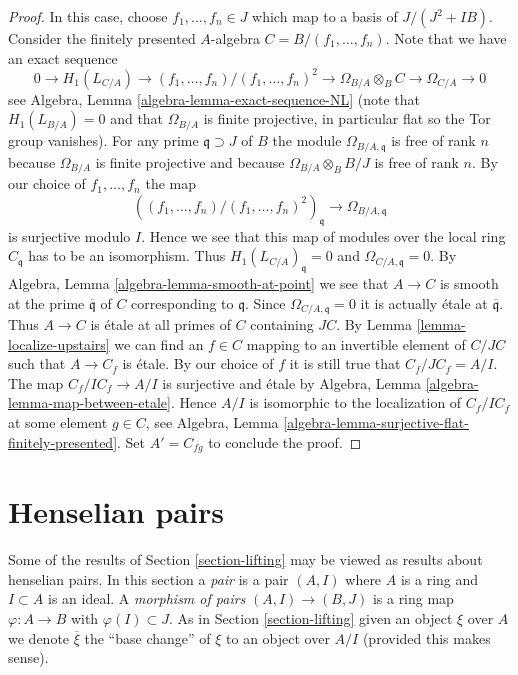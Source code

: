 \begin{proof}
\medskip\noindent
In this case, choose $f_1, \ldots, f_n \in J$ which map to a
basis of $J/(J^2 + IB)$. Consider the finitely presented $A$-algebra
$C = B/(f_1, \ldots, f_n)$. Note that we have an exact sequence
$$
0 \to H_1(L_{C/A}) \to (f_1, \ldots, f_n)/(f_1, \ldots, f_n)^2
\to \Omega_{B/A} \otimes_B C \to \Omega_{C/A} \to 0
$$
see Algebra, Lemma \ref{algebra-lemma-exact-sequence-NL} (note that
$H_1(L_{B/A}) = 0$ and that $\Omega_{B/A}$ is finite projective,
in particular flat so the Tor group vanishes). For any prime
$\mathfrak q \supset J$ of $B$ the module $\Omega_{B/A, \mathfrak q}$
is free of rank $n$ because $\Omega_{B/A}$ is finite projective and
because $\Omega_{B/A} \otimes_B B/J$ is free of rank $n$. By our choice
of $f_1, \ldots, f_n$ the map
$$
\left((f_1, \ldots, f_n)/(f_1, \ldots, f_n)^2\right)_{\mathfrak q}
\to
\Omega_{B/A, \mathfrak q}
$$
is surjective modulo $I$. Hence we see that this map of modules over
the local ring $C_{\mathfrak q}$ has to be an isomorphism. Thus
$H_1(L_{C/A})_{\mathfrak q} = 0$ and $\Omega_{C/A, \mathfrak q} = 0$. By
Algebra, Lemma \ref{algebra-lemma-smooth-at-point}
we see that $A \to C$ is smooth at the prime $\overline{\mathfrak q}$
of $C$ corresponding to $\mathfrak q$. Since
$\Omega_{C/A, \mathfrak q} = 0$ it is actually \'etale at
$\overline{\mathfrak q}$. Thus $A \to C$ is \'etale at all primes
of $C$ containing $JC$. By Lemma \ref{lemma-localize-upstairs}
we can find an $f \in C$ mapping to an invertible element of $C/JC$ such that
$A \to C_f$ is \'etale. By our choice of $f$ it is still true that
$C_f/JC_f = A/I$. The map $C_f/IC_f \to A/I$ is surjective and
\'etale by Algebra, Lemma \ref{algebra-lemma-map-between-etale}.
Hence $A/I$ is isomorphic to the localization of $C_f/IC_f$ at
some element $g \in C$, see
Algebra, Lemma \ref{algebra-lemma-surjective-flat-finitely-presented}.
Set $A' = C_{fg}$ to conclude the proof.
\end{proof}








\section{Henselian pairs}
\label{section-henselian-pairs}

\noindent
Some of the results of Section \ref{section-lifting} may be viewed as results
about henselian pairs. In this section a {\it pair} is a pair $(A, I)$
where $A$ is a ring and $I \subset A$ is an ideal. A {\it morphism of pairs}
$(A, I) \to (B, J)$ is a ring map $\varphi : A \to B$ with
$\varphi(I) \subset J$. As in
Section \ref{section-lifting} given an object $\xi$ over $A$ we denote
$\overline{\xi}$ the ``base change'' of $\xi$ to an object over $A/I$
(provided this makes sense).

